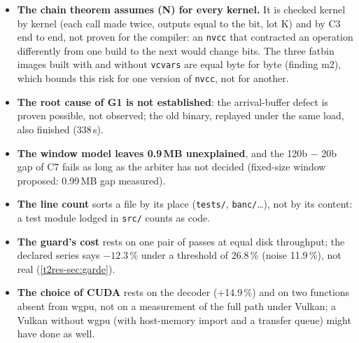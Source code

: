 \begin{faux}
\begin{itemize}
\item \textbf{The chain theorem assumes (N) for every kernel.} It is checked kernel by kernel (each call made twice, outputs equal to the bit, lot K) and by C3 end to end, not proven for the compiler: an \texttt{nvcc} that contracted an operation differently from one build to the next would change bits. The three fatbin images built with and without \texttt{vcvars} are equal byte for byte (finding m2), which bounds this risk for one version of \texttt{nvcc}, not for another.
\item \textbf{The root cause of G1 is not established}: the arrival-buffer defect is proven possible, not observed; the old binary, replayed under the same load, also finished (338\,s).
\item \textbf{The window model leaves 0.9\,MB unexplained}, and the 120b $-$ 20b gap of C7 fails as long as the arbiter has not decided (fixed-size window proposed: 0.99\,MB gap measured).
\item \textbf{The line count} sorts a file by its place (\texttt{tests/}, \texttt{banc/}…), not by its content: a test module lodged in \texttt{src/} counts as code.
\item \textbf{The guard's cost} rests on one pair of passes at equal disk throughput; the declared series says $-12.3\,\%$ under a threshold of 26.8\,\% (noise 11.9\,\%), not real (\cref{t2res-sec:garde}).
\item \textbf{The choice of CUDA} rests on the decoder (+14.9\,\%) and on two functions absent from wgpu, not on a measurement of the full path under Vulkan; a Vulkan without wgpu (with host-memory import and a transfer queue) might have done as well.
\end{itemize}
\end{faux}

